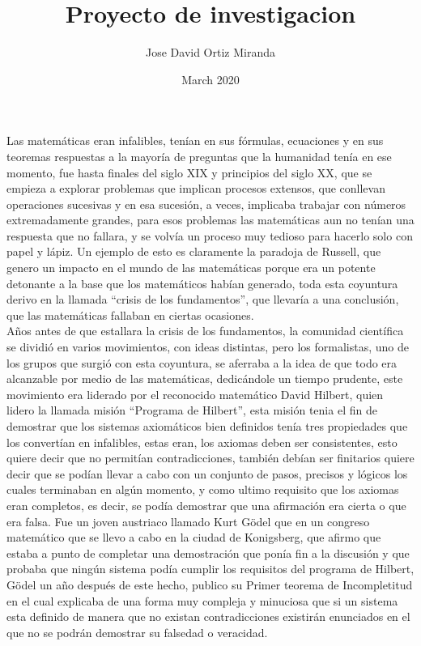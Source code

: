 \documentclass{article}
\title{Proyecto de investigacion}
\author{Jose David Ortiz Miranda}
\date{March 2020}
\begin{document}
\maketitle

Las matemáticas eran infalibles, tenían en sus fórmulas, ecuaciones y en sus teoremas respuestas a la mayoría de preguntas que la humanidad tenía en ese momento, fue hasta finales del siglo XIX y principios del siglo XX, que se empieza a explorar problemas que implican procesos extensos, que conllevan operaciones sucesivas y en esa sucesión, a veces, implicaba trabajar con números extremadamente grandes, para esos problemas las matemáticas aun no tenían una respuesta que no fallara, y se volvía un proceso muy tedioso para hacerlo solo con papel y lápiz. Un ejemplo de esto es claramente la paradoja de Russell, que genero un impacto en el mundo de las matemáticas porque era un potente detonante a la base que los matemáticos habían generado, toda esta coyuntura derivo en la llamada “crisis de los fundamentos”, que llevaría a una conclusión, que las matemáticas fallaban en ciertas ocasiones.\\
Años antes de que estallara la crisis de los fundamentos, la comunidad científica se dividió en varios movimientos, con ideas distintas, pero los formalistas, uno de los grupos que surgió con esta coyuntura, se aferraba a la idea de que todo era alcanzable por medio de las matemáticas, dedicándole un tiempo prudente, este movimiento era liderado por el reconocido matemático David Hilbert, quien lidero la llamada misión “Programa de Hilbert”, esta misión tenia el fin de demostrar que los sistemas axiomáticos bien definidos tenía tres propiedades que los convertían en infalibles, estas eran, los axiomas deben ser consistentes, esto quiere decir que no permitían contradicciones, también debían ser finitarios quiere decir que se podían llevar a cabo con un conjunto de pasos, precisos y lógicos los cuales terminaban en algún momento, y como ultimo requisito que los axiomas eran completos, es decir, se podía demostrar que una afirmación era cierta o que era falsa. Fue un joven  austriaco llamado Kurt Gödel que en un congreso matemático que se llevo a cabo en la ciudad de Konigsberg, que afirmo que estaba a punto de completar una demostración que ponía fin a la discusión y que probaba que ningún sistema podía cumplir los requisitos del programa de Hilbert, Gödel un año después de este hecho, publico su Primer teorema de Incompletitud en el cual explicaba de una forma muy compleja y minuciosa que si un sistema esta definido de manera que no existan contradicciones existirán enunciados en el que no se podrán demostrar su falsedad o veracidad.\\
\end{document}
